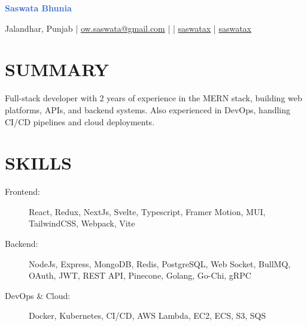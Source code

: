 \documentclass[]{resume}
\begin{document}
\textrm{\Huge\textcolor{highlight}{\textbf{Saswata Bhunia}}}
\vspace{.4em}

Jalandhar, Punjab | \href{mailto:ow.saswata@gmail.com}{\faEnvelope \space ow.saswata@gmail.com} | \faPhone {} | \href{https://www.linkedin.com/in/saswatax}{\faLinkedin \space saswatax} | \href{https://github.com/saswatax}{\faGithub \space saswatax}
\vspace{.4em}

\section{SUMMARY}
Full-stack developer with 2 years of experience in the MERN stack, building web platforms, APIs, and backend systems. Also experienced in DevOps, handling CI/CD pipelines and cloud deployments.

\section{SKILLS}
\begin{description}
  \item[Frontend:] React, Redux, NextJs, Svelte, Typescript, Framer Motion, MUI, TailwindCSS, Webpack, Vite
  \item[Backend:] NodeJs, Express, MongoDB, Redis, PostgreSQL, Web Socket, BullMQ, OAuth, JWT, REST API, Pinecone, Golang, Go-Chi, gRPC
  \item[DevOps \& Cloud:] Docker, Kubernetes, CI/CD, AWS Lambda, EC2, ECS, S3, SQS
\end{description}
\end{document}
